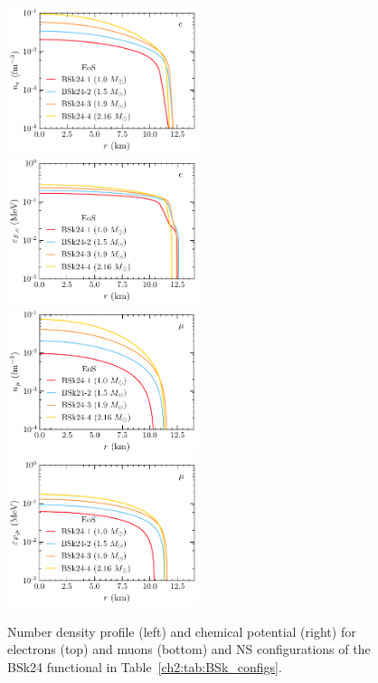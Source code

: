 \begin{figure}[t] 
    \centering
    \includegraphics[width=0.495\textwidth]{capture_2/NS_ne_r_BSk24.pdf}
    \includegraphics[width=0.495\textwidth]{capture_2/NS_MuFe_r_BSk24.pdf}
    \includegraphics[width=0.495\textwidth]{capture_2/NS_nmu_r_BSk24.pdf}
    \includegraphics[width=0.495\textwidth]{capture_2/NS_MuFmu_r_BSk24.pdf}
    \caption{Number density profile (left) and chemical potential (right) for electrons (top) and muons (bottom) and NS configurations of the  BSk24 functional in Table~\ref{ch2:tab:BSk_configs}. 
    }
    \label{ch4:fig:NSradprofs1}
\end{figure}




